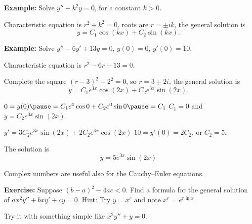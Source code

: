 \documentclass[10pt,aspectratio=169]{beamer}
\begin{document}
\begin{frame}

\textbf{Example:} Solve $y'' + k^2 y = 0$, for a constant $k > 0$.

\medskip
\pause

Characteristic equation is $r^2 + k^2 = 0$,
\pause
roots are $r = \pm ik$,
\pause
the general solution is
\[
y = C_1 \cos (kx) + C_2 \sin (kx) .
\]

\medskip
\pause

\textbf{Example:}
Solve \quad $y'' - 6 y' + 13 y = 0$, $y(0) = 0$, $y'(0) = 10$.

\medskip
\pause

Characteristic equation is $r^2 - 6 r + 13 = 0$.

\pause
Complete the square ${(r-3)}^2 + 2^2 = 0$,
\pause
so $r = 3 \pm 2i$,
\pause
the general solution is
\[
y =
C_1 e^{3x} \cos (2x) + C_2 e^{3x} \sin (2x).
\]

\medskip
\pause

$0 = y(0)
\pause
= C_1 e^{0} \cos 0 + C_2 e^{0} \sin 0
\pause
= C_1$
\pause
\wthus $C_1 = 0$ and $y = C_2 e^{3x} \sin (2x)$.

\medskip
\pause
$y' = 3C_2 e^{3x} \sin (2x) + 2C_2 e^{3x} \cos (2x)$
\pause
\wthus $10 = y'(0) = 2C_2$, or $C_2 = 5$.

\medskip
\pause
The solution is
\[
y = 5 e^{3x} \sin (2x) 
\]

\end{frame}

\begin{frame}
Complex numbers are useful also for the Cauchy--Euler equations.

\medskip

\textbf{Exercise:}
Suppose ${(b-a)}^2-4ac < 0$.  Find a formula for the general solution
of $a x^2 y'' + b x y' + c y = 0$.  Hint: Try $y=x^r$ and note $x^r = e^{r \ln x}$.

\medskip
\pause

Try it with something simple like $x^2 y'' + y = 0$.

\end{frame}
\end{document}

